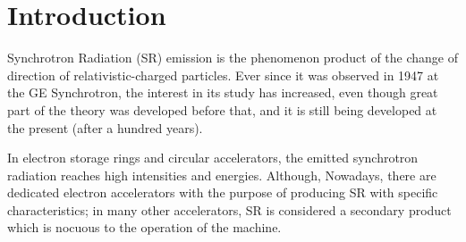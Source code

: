 
\chapter{Introduction} %

\label{intro} %



Synchrotron Radiation (SR) emission is the phenomenon
product of the change of direction of relativistic-charged particles.  Ever
since it was observed in 1947 at the GE Synchrotron,  the
interest in its study has increased, even though great part of the theory was
developed before that, and it is still being developed at the present (after a
hundred years).

In electron storage rings and circular accelerators, the emitted synchrotron
radiation reaches high intensities and energies. Although, Nowadays, there are
dedicated electron accelerators with the purpose of producing SR with specific
characteristics; in many other accelerators, SR is considered a secondary
product which is nocuous to the operation of the machine.

